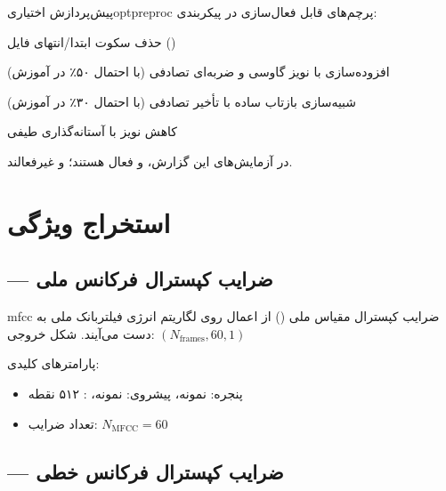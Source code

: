 \documentclass[12pt]{report}
\begin{document}
\begin{tecbox}{پیش‌پردازش اختیاری}{optpreproc}
    پرچم‌های قابل فعال‌سازی در پیکربندی:
    \begin{description}[noitemsep]
        \item[\lr{USE\_VAD}] حذف سکوت ابتدا/انتهای فایل ()
        \item[\lr{USE\_RAWBOOST}] افزوده‌سازی با نویز گاوسی و ضربه‌ای تصادفی (با احتمال ۵۰٪ در آموزش)
        \item[\lr{USE\_REVERB}] شبیه‌سازی بازتاب ساده با تأخیر تصادفی (با احتمال ۳۰٪ در آموزش)
        \item[\lr{USE\_DENOISING}] کاهش نویز با آستانه‌گذاری طیفی
    \end{description}
\end{tecbox}

\begin{notebox}
    در آزمایش‌های این گزارش،  و  فعال هستند؛
     و  غیرفعالند.
\end{notebox}

\chapter{استخراج ویژگی}

\section{ — ضرایب کپسترال فرکانس ملی}

\begin{dfnbox}{}{mfcc}
    ضرایب کپسترال مقیاس ملی () از اعمال
     روی لگاریتم انرژی فیلتربانک ملی به دست می‌آیند.
    شکل خروجی: $(N_{\text{frames}}, 60, 1)$
\end{dfnbox}

پارامترهای کلیدی:
\begin{itemize}[noitemsep]
    \item پنجره:  نمونه، پیشروی:  نمونه، : ۵۱۲ نقطه
    \item تعداد ضرایب: $N_{\text{MFCC}} = 60$
\end{itemize}

\section{ — ضرایب کپسترال فرکانس خطی}
\end{document}

